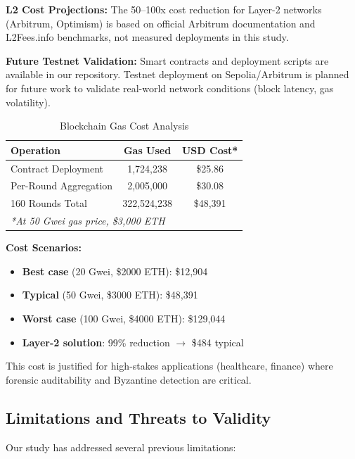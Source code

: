 \documentclass{ieeeaccess}
\begin{document}
\textbf{L2 Cost Projections:} The 50--100x cost reduction for Layer-2 networks (Arbitrum, Optimism) is based on official Arbitrum documentation and L2Fees.info benchmarks, not measured deployments in this study.

\textbf{Future Testnet Validation:} Smart contracts and deployment scripts are available in our repository. Testnet deployment on Sepolia/Arbitrum is planned for future work to validate real-world network conditions (block latency, gas volatility).

\begin{table}[t]
\caption{Blockchain Gas Cost Analysis}
\label{tab:gas_cost}
\centering
\begin{tabular}{lcc}
\toprule
\textbf{Operation} & \textbf{Gas Used} & \textbf{USD Cost*} \\
\midrule
Contract Deployment & 1,724,238 & \$25.86 \\
Per-Round Aggregation & 2,005,000 & \$30.08 \\
160 Rounds Total & 322,524,238 & \$48,391 \\
\midrule
\multicolumn{3}{l}{\textit{*At 50 Gwei gas price, \$3,000 ETH}} \\
\bottomrule
\end{tabular}
\end{table}

\textbf{Cost Scenarios:}
\begin{itemize}
    \item \textbf{Best case} (20 Gwei, \$2000 ETH): \$12,904
    \item \textbf{Typical} (50 Gwei, \$3000 ETH): \$48,391
    \item \textbf{Worst case} (100 Gwei, \$4000 ETH): \$129,044
    \item \textbf{Layer-2 solution}: 99\% reduction $\rightarrow$ \$484 typical
\end{itemize}

This cost is justified for high-stakes applications (healthcare, finance) where forensic auditability and Byzantine detection are critical.

\subsection{Limitations and Threats to Validity}

Our study has addressed several previous limitations:
\end{document}
